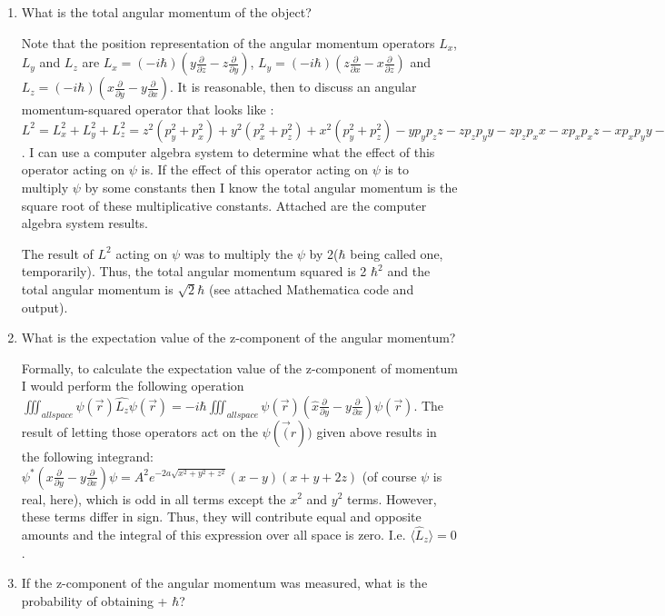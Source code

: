 \documentclass[aps,prl,preprint,groupedaddress]{revtex4-1}
\begin{document}
\begin{enumerate}
	\item What is the total angular momentum of the object?
	
	Note that the position representation of the angular momentum operators $L_x$, $L_y$ and $L_z$ are $L_x = (-i\hbar) (y\frac{\partial}{\partial z} - z\frac{\partial}{\partial y})$, $L_y = (-i\hbar) (z\frac{\partial}{\partial x} - x\frac{\partial}{\partial z})$ and $L_z = (-i\hbar) (x\frac{\partial}{\partial y} - y\frac{\partial}{\partial x})$. It is reasonable, then to discuss an angular momentum-squared operator that looks like : $L^2=L_x^2+L_y^2+L_z^2 = z^2(p_y^2+p_x^2)+y^2(p_x^2+p_z^2)+x^2(p_y^2+p_z^2)-yp_yp_zz-zp_zp_yy-zp_zp_xx-xp_xp_xz-xp_xp_yy-yp_yp_xx$. I can use a computer algebra system to determine what the effect of this operator acting on $\psi$ is. If the effect of this operator acting on $\psi$ is to multiply $\psi$ by some constants then I know the total angular momentum is the square root of these multiplicative constants. Attached are the computer algebra system results.
	
	The result of $L^2$ acting on $\psi$ was to multiply the $\psi$ by 2($\hbar$ being called one, temporarily). Thus, the total angular momentum squared is 2 $\hbar^2$ and the total angular momentum is $\sqrt{2}\hbar$ (see attached Mathematica code and output).
	
	\item What is the expectation value of the z-component of the angular momentum?
	
	Formally, to calculate the expectation value of the z-component of momentum I would perform the following operation $\iiint_{all space}{\psi(\vec{r})\hat{L_z}\psi(\vec{r})}=-i\hbar\iiint_{all space}{\psi(\vec{r})(\hat{x}\frac{\partial}{\partial y} - y \frac{\partial}{\partial  x})\psi(\vec{r})}$. The result of letting those operators act on the $\psi(\vec(r))$ given above results in the following integrand: $\psi^*(x\frac{\partial}{\partial y} - y \frac{\partial}{\partial x})\psi = A^2e^{-2a\sqrt{x^2+y^2+z^2}}(x-y)(x+y+2z) $ (of course $\psi$ is real, here), which is odd in all terms except the $x^2$ and $y^2$ terms. However, these terms differ in sign. Thus, they will contribute equal and opposite amounts and the integral of this expression over all space is zero. I.e. $\langle \hat{L}_z \rangle = 0$.
	
	\item If the z-component of the angular momentum was measured, what is the probability of obtaining + $\hbar$?
	

\end{enumerate}
\end{document}
